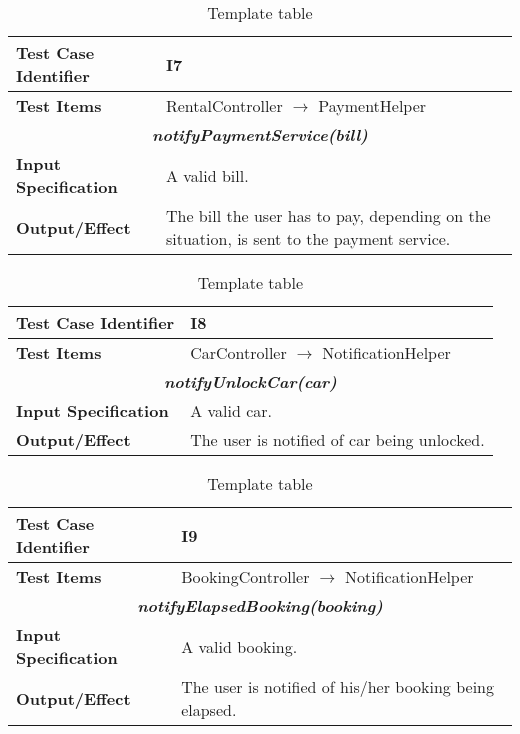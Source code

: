 \begin{table}[h]
	\begin{tabularx}{\textwidth}{l X}
		\hline
		\textbf{Test Case Identifier}	&	I7\\	\hline
		\textbf{Test Items}			&	RentalController $\rightarrow$ PaymentHelper \\	\hline\hline
		\multicolumn{2}{c}{\textbf{\textit{notifyPaymentService(bill)}}}	\\	\hline
			\textbf{Input Specification}	&	A valid bill.\\	\hline
			\textbf{Output/Effect}	&	The bill the user has to pay, depending on the situation, is sent to the payment service.\\	\hline\hline
	\end{tabularx}
	\captionsetup{textformat=empty,labelformat=blank}
	\caption{Template table}
	\label{table:template-table}
\end{table}

\begin{table}[h]
	\begin{tabularx}{\textwidth}{l X}
		\hline
		\textbf{Test Case Identifier}	&	I8\\	\hline
		\textbf{Test Items}			&	CarController $\rightarrow$ NotificationHelper \\	\hline\hline
		\multicolumn{2}{c}{\textbf{\textit{notifyUnlockCar(car)}}}	\\	\hline
			\textbf{Input Specification}	&	A valid car.\\	\hline
			\textbf{Output/Effect}	&	The user is notified of car being unlocked.\\	\hline\hline
	\end{tabularx}
	\captionsetup{textformat=empty,labelformat=blank}
	\caption{Template table}
	\label{table:template-table}
\end{table}

\begin{table}[h]
	\begin{tabularx}{\textwidth}{l X}
		\hline
		\textbf{Test Case Identifier}	&	I9\\	\hline
		\textbf{Test Items}			&	BookingController $\rightarrow$ NotificationHelper \\	\hline\hline
		\multicolumn{2}{c}{\textbf{\textit{notifyElapsedBooking(booking)}}}	\\	\hline
			\textbf{Input Specification}	&	A valid booking.\\	\hline
			\textbf{Output/Effect}	&	The user is notified of his/her booking being elapsed.\\	\hline\hline
	\end{tabularx}
	\captionsetup{textformat=empty,labelformat=blank}
	\caption{Template table}
	\label{table:template-table}
\end{table}

